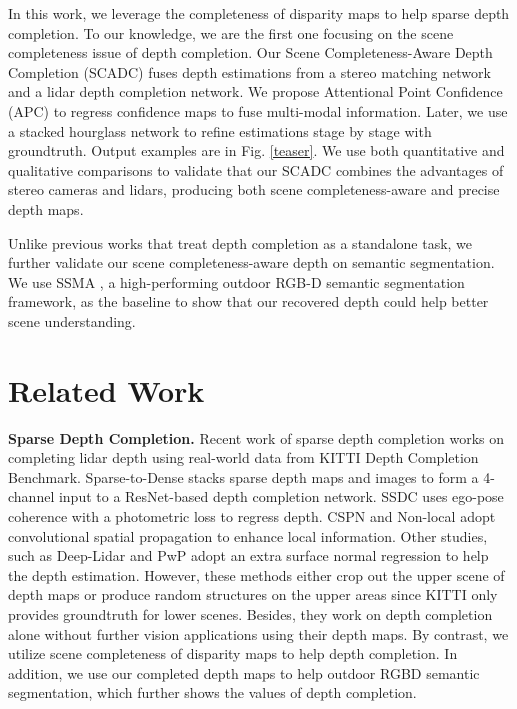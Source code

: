\documentclass{article}
\begin{document}
In this work, we leverage the completeness of disparity maps to help sparse depth completion. To our knowledge, we are the first one focusing on the scene completeness issue of depth completion. Our Scene Completeness-Aware Depth Completion (SCADC) fuses depth estimations from a stereo matching network and a lidar depth completion network. We propose Attentional Point Confidence (APC) to regress confidence maps to fuse multi-modal information. Later, we use a stacked hourglass network to refine estimations stage by stage with groundtruth. Output examples are in Fig. \ref{teaser}. We use both quantitative and qualitative comparisons to validate that our SCADC combines the advantages of stereo cameras and lidars, producing both scene completeness-aware and precise depth maps.

Unlike previous works that treat depth completion as a standalone task, we further validate our scene completeness-aware depth on semantic segmentation. We use SSMA \cite{valada19ijcv}, a high-performing outdoor RGB-D semantic segmentation framework, as the baseline to show that our recovered depth could help better scene understanding.

\section{Related Work}
\label{sec:related}

\textbf{Sparse Depth Completion.} Recent work of sparse depth completion works on completing lidar depth using real-world data from KITTI Depth Completion Benchmark. Sparse-to-Dense \cite{Ma2017SparseToDense} stacks sparse depth maps and images to form a 4-channel input to a ResNet-based depth completion network. SSDC \cite{ma2019self} uses ego-pose coherence with a photometric loss to regress depth. CSPN \cite{cheng2018learning} and Non-local \cite{park2020non} adopt convolutional spatial propagation to enhance local information. Other studies, such as Deep-Lidar \cite{qiu2018deeplidar} and PwP \cite{xu2019depth} adopt an extra surface normal regression to help the depth estimation. However, these methods either crop out the upper scene of depth maps or produce random structures on the upper areas since KITTI only provides groundtruth for lower scenes. Besides, they work on depth completion alone without further vision applications using their depth maps. By contrast, we utilize scene completeness of disparity maps to help depth completion. In addition, we use our completed depth maps to help outdoor RGBD semantic segmentation, which further shows the values of depth completion.  
\end{document}
